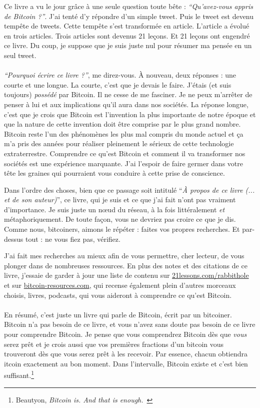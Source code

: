 Ce livre a vu le jour grâce à une seule question toute bête :
\textit{\enquote{Qu'avez-vous appris de Bitcoin ?}}. J'ai tenté d'y répondre
d'un simple tweet. Puis le tweet est devenu tempête de tweets. Cette tempête
s'est transformée en article. L'article a évolué en trois articles. Trois
articles sont devenus 21 leçons. Et 21 leçons ont engendré ce livre. Du coup, je
suppose que je suis juste nul pour résumer ma pensée en un seul tweet.

\paragraph{}
\textit{\enquote{Pourquoi écrire ce livre ?}}, me direz-vous. À nouveau, deux
réponses : une courte et une longue. La courte, c'est que je devais le faire.
J'étais (et suis toujours) \textit{possédé} par Bitcoin. Il ne cesse de me
fasciner. Je ne peux m'arrêter de penser à lui et aux implications qu'il aura
dans nos sociétés. La réponse longue, c'est que je crois que Bitcoin est
l'invention la plus importante de notre époque et que la nature de cette
invention doit être comprise par le plus grand nombre. Bitcoin reste l'un des
phénomènes les plus mal compris du monde actuel et ça m'a pris des années pour
réaliser pleinement le sérieux de cette technologie extraterrestre. Comprendre
ce qu'est Bitcoin et comment il va transformer nos sociétés est une expérience
marquante. J'ai l'espoir de faire germer dans votre tête les graines qui
pourraient vous conduire à cette prise de conscience.

Dans l'ordre des choses, bien que ce passage soit intitulé \enquote{\textit{À
propos de ce livre (... et de son auteur)}}, ce livre, qui je suis et ce que
j'ai fait n'ont pas vraiment d'importance. Je suis juste un nœud du réseau, à la
fois littéralement \textit{et} métaphoriquement. De toute façon, vous ne devriez
pas croire ce que je dis. Comme nous, bitcoiners, aimons le répéter : faites vos
propres recherches. Et par-dessus tout : ne vous fiez pas, vérifiez.

J'ai fait mes recherches au mieux afin de vous permettre, cher lecteur, de vous
plonger dans de nombreuses ressources. En plus des notes et des citations de ce
livre, j'essaie de garder à jour une liste de contenu sur
\href{https://21lessons.com/rabbithole}{21lessons.com/rabbithole} et sur
\href{https://bitcoin-resources.com}{bitcoin-resources.com}, qui recense
également plein d'autres morceaux choisis, livres, podcasts, qui vous aideront à
comprendre ce qu'est Bitcoin.

\paragraph{}
En résumé, c'est juste un livre qui parle de Bitcoin, écrit par un bitcoiner.
Bitcoin n'a pas besoin de ce livre, et vous n'avez sans doute pas besoin de ce
livre pour comprendre Bitcoin. Je pense que vous comprendrez Bitcoin dès que
\textit{vous} serez prêt et je crois aussi que vos premières fractions d'un
bitcoin vous trouveront dès que vous serez prêt à les recevoir. Par essence,
chacun obtiendra \bitcoinB{}itcoin exactement au bon moment. Dans l'intervalle,
Bitcoin existe et c'est bien suffisant.\footnote{Beautyon, \textit{Bitcoin is.
And that is enough.}~\cite{bitcoin-is}}
